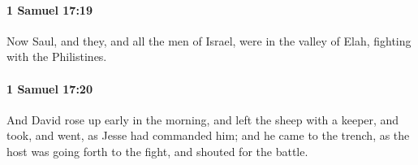 		\paragraph{1 Samuel 17:19} %
			\label{1SAMUEL-17-19}

			Now Saul, and they, and all the men of Israel, were in the valley of Elah, fighting with the Philistines.


		\paragraph{1 Samuel 17:20} %
			\label{1SAMUEL-17-20}

			And David rose up early in the morning, and left the sheep with a keeper, and took, and went, as Jesse had commanded him; and he came to the trench, as the host was going forth to the fight, and shouted for the battle.



